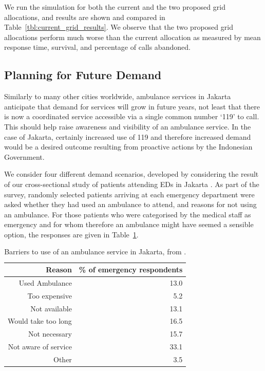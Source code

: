 \documentclass[preprint,12pt]{elsarticle}
\begin{document}
We run the simulation for both the current and the two proposed grid
allocations, and results are shown and compared in
Table~\ref{tbl:current_grid_results}. We observe that the two proposed
grid allocations perform much worse than the current allocation as measured by
mean response time, survival, and percentage of calls abandoned.


\subsection{Planning for Future Demand}\label{sec:demand_scenarios}
Similarly to many other cities worldwide, ambulance services in Jakarta
anticipate that demand for services will grow in future years, not least that
there is now a coordinated service accessible via a single common number `119'
to call. This should help raise awareness and visibility of an ambulance
service. In the case of Jakarta, certainly increased use of 119 and therefore
increased demand would be a desired outcome resulting from proactive actions
by the Indonesian Government. 

We consider four different demand scenarios, developed by considering the
result of our cross-sectional study of patients attending EDs in Jakarta
\cite{BriceSyaribahNoor2022Esui}. As part of the survey, randomly selected
patients arriving at each emergency department were asked whether they had
used an ambulance to attend, and reasons for not using an ambulance. For those
patients who were categorised by the medical staff as emergency and for whom
therefore an ambulance might have seemed a sensible option, the responses are
given in Table~\ref{table:survey_results}.

\begin{table}
\centering
\begin{tabular}{rr}
\toprule
Reason & \% of emergency respondents \\
\midrule
Used Ambulance & 13.0\\
Too expensive & 5.2  \\
Not available  & 13.1 \\
Would take too long & 16.5 \\
Not necessary & 15.7  \\
Not aware of service & 33.1\\
Other &3.5 \\
\bottomrule
\end{tabular}
\caption{Barriers to use of an ambulance service in Jakarta, from
         \cite{BriceSyaribahNoor2022Esui}.}
\label{table:survey_results}
\end{table}
\end{document}
